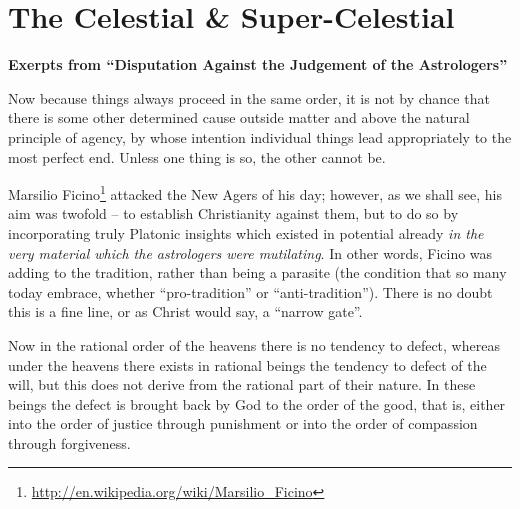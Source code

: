 \section{The Celestial \& Super-Celestial}

\textbf{Exerpts from ``Disputation Against the Judgement of the Astrologers''}

\begin{quotex}
Now because things always proceed in the same order, it is not by chance that there is some other determined cause outside matter and above the natural principle of agency, by whose intention individual things lead appropriately to the most perfect end. Unless one thing is so, the other cannot be.
\end{quotex}


Marsilio Ficino\footnote{\url{http://en.wikipedia.org/wiki/Marsilio\_Ficino}} attacked the New Agers of his day; however, as we shall see, his aim was twofold -- to establish Christianity against them, but to do so by incorporating truly Platonic insights which existed in potential already \emph{in the very material which the astrologers were mutilating}. In other words, Ficino was adding to the tradition, rather than being a parasite (the condition that so many today embrace, whether ``pro-tradition'' or ``anti-tradition''). There is no doubt this is a fine line, or as Christ would say, a ``narrow gate''.

\begin{quotex}
Now in the rational order of the heavens there is no tendency to defect, whereas under the heavens there exists in rational beings the tendency to defect of the will, but this does not derive from the rational part of their nature. In these beings the defect is brought back by God to the order of the good, that is, either into the order of justice through punishment or into the order of compassion through forgiveness.
\end{quotex}


